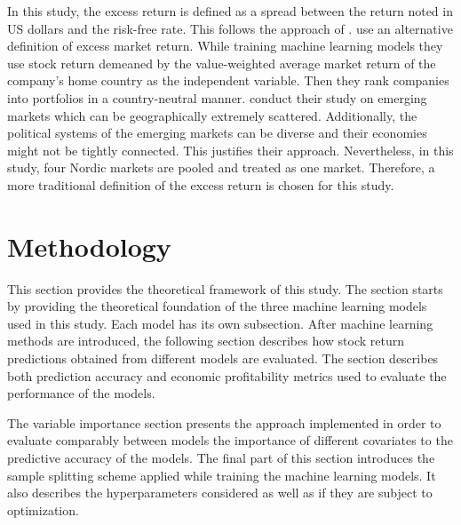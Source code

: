 \documentclass[12pt]{article}
\begin{document}
In this study, the excess return is defined as a spread between the return noted in US dollars and the risk-free rate. This follows the approach of \citet{guetal}. \citet{HANAUER2023} use an alternative definition of excess market return. While training machine learning models they use stock return demeaned by the value-weighted average market return of the company's home country as the independent variable. Then they rank companies into portfolios in a country-neutral manner. \citeauthor{HANAUER2023} conduct their study on emerging markets which can be geographically extremely scattered. Additionally, the political systems of the emerging markets can be diverse and their economies might not be tightly connected. This justifies their approach. Nevertheless, in this study, four Nordic markets are pooled and treated as one market. Therefore, a more traditional definition of the excess return is chosen for this study.\footnotemark {} \par



\section{Methodology} \label{Methodology}

This section provides the theoretical framework of this study. The section starts by providing the theoretical foundation of the three machine learning models used in this study. Each model has its own subsection. After machine learning methods are introduced, the following section describes how stock return predictions obtained from different models are evaluated. The section describes both prediction accuracy and economic profitability metrics used to evaluate the performance of the models. \par

The variable importance section presents the approach implemented in order to evaluate comparably between models the importance of different covariates to the predictive accuracy of the models. The final part of this section introduces the sample splitting scheme applied while training the machine learning models. It also describes the hyperparameters considered as well as if they are subject to optimization. \par
\end{document}
